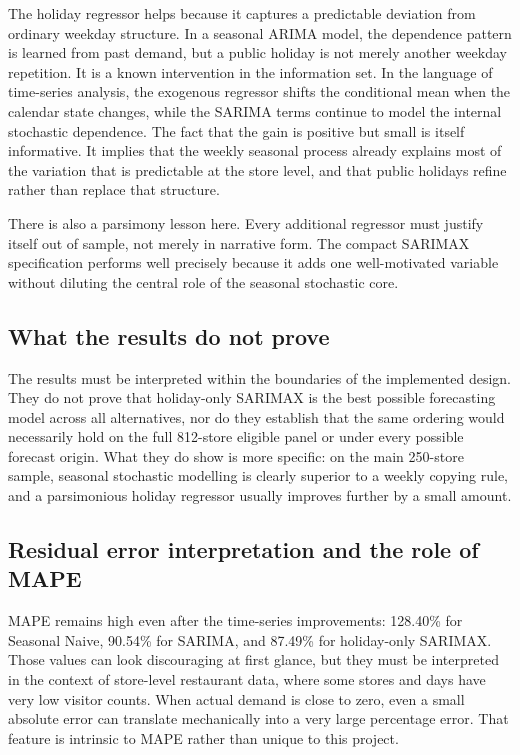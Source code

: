 \documentclass[11pt,oneside]{scrartcl}
\begin{document}
The holiday regressor helps because it captures a predictable deviation from ordinary weekday structure. In a seasonal ARIMA model, the dependence pattern is learned from past demand, but a public holiday is not merely another weekday repetition. It is a known intervention in the information set. In the language of time-series analysis, the exogenous regressor shifts the conditional mean when the calendar state changes, while the SARIMA terms continue to model the internal stochastic dependence. The fact that the gain is positive but small is itself informative. It implies that the weekly seasonal process already explains most of the variation that is predictable at the store level, and that public holidays refine rather than replace that structure.

There is also a parsimony lesson here. Every additional regressor must justify itself out of sample, not merely in narrative form. The compact SARIMAX specification performs well precisely because it adds one well-motivated variable without diluting the central role of the seasonal stochastic core.

\subsection{What the results do not prove}
The results must be interpreted within the boundaries of the implemented design. They do not prove that holiday-only SARIMAX is the best possible forecasting model across all alternatives, nor do they establish that the same ordering would necessarily hold on the full 812-store eligible panel or under every possible forecast origin. What they do show is more specific: on the main 250-store sample, seasonal stochastic modelling is clearly superior to a weekly copying rule, and a parsimonious holiday regressor usually improves further by a small amount.

\subsection{Residual error interpretation and the role of MAPE}
MAPE remains high even after the time-series improvements: 128.40\% for Seasonal Naive, 90.54\% for SARIMA, and 87.49\% for holiday-only SARIMAX. Those values can look discouraging at first glance, but they must be interpreted in the context of store-level restaurant data, where some stores and days have very low visitor counts. When actual demand is close to zero, even a small absolute error can translate mechanically into a very large percentage error. That feature is intrinsic to MAPE rather than unique to this project.
\end{document}

